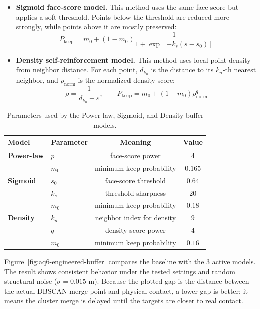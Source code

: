 \documentclass[11pt,a4paper]{report}
\begin{document}
\begin{contentbox}
\begin{itemize}[leftmargin=*]
    \item \textbf{Sigmoid face-score model.} This method uses the same face score but applies a soft threshold. Points below the threshold are reduced more strongly, while points above it are mostly preserved:
    \begin{equation}
    P_{\text{keep}} = m_0 + (1 - m_0)\frac{1}{1+\exp[-k_s(s-s_0)]}
    \end{equation}

    \item \textbf{Density self-reinforcement model.} This method uses local point density from neighbor distance. For each point, $d_{k_n}$ is the distance to its $k_n$-th nearest neighbor, and $\rho_{\text{norm}}$ is the normalized density score:
    \begin{equation}
    \rho = \frac{1}{d_{k_n}+\varepsilon}, \qquad
    P_{\text{keep}} = m_0 + (1 - m_0)\rho_{\text{norm}}^q
    \end{equation}
\end{itemize}

\begin{table}[h!]
\centering
\small
\renewcommand{\arraystretch}{1.2}
\begin{tabular}{llcc}
\hline
\textbf{Model} & \textbf{Parameter} & \textbf{Meaning} & \textbf{Value} \\ \hline
\textbf{Power-law} & $p$ & face-score power & $4$ \\
                  & $m_0$ & minimum keep probability & $0.165$ \\ \hline
\textbf{Sigmoid}  & $s_0$ & face-score threshold & $0.64$ \\
                  & $k_s$ & threshold sharpness & $20$ \\
                  & $m_0$ & minimum keep probability & $0.18$ \\ \hline
\textbf{Density}  & $k_n$ & neighbor index for density & $9$ \\
                  & $q$ & density-score power & $4$ \\
                  & $m_0$ & minimum keep probability & $0.16$ \\ \hline
\end{tabular}
\caption{Parameters used by the Power-law, Sigmoid, and Density buffer models.}
\label{tab:aq6_parameters}
\end{table}

Figure~\ref{fig:aq6-engineered-buffer} compares the baseline with the 3 active models. The result shows consistent behavior under the tested settings and random structural noise ($\sigma = 0.015\text{ m}$). Because the plotted gap is the distance between the actual DBSCAN merge point and physical contact, a lower gap is better: it means the cluster merge is delayed until the targets are closer to real contact.


\end{contentbox}
\end{document}
